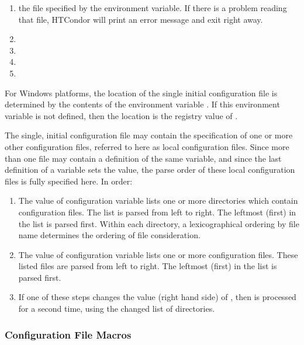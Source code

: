 \begin{enumerate}
   \item the file specified by the  environment variable.
   If there is a problem reading that file, HTCondor will print an error
   message and exit right away.
   \item {}
   \item {}
   \item {}
   \item {}
\end{enumerate}

For Windows platforms, 
the location of the single initial configuration file is determined by 
the contents of the environment variable .
If this environment variable is not defined, 
then the location is the registry value of 
. 

The single, initial configuration file may contain the specification 
of one or more other configuration files, referred to here as
local configuration files.
Since more than one file may contain a definition of the same variable,
and since the last definition of a variable sets the value, 
the parse order of these local configuration files
is fully specified here. 
In order: 
\begin{enumerate}
   \item The value of configuration variable  lists 
   one or more directories which contain configuration files. 
   The list is parsed from left to right. 
   The leftmost (first) in the list is parsed first. 
   Within each directory, 
   a lexicographical ordering by file name determines the ordering of 
   file consideration.
   \item The value of configuration variable  
   lists one or more configuration files. 
   These listed files are parsed from  left to right.
   The leftmost (first) in the list is parsed first.
   \item If one of these steps changes the value (right hand side) of 
   , 
   then  is processed for a second time,
    using the changed list of directories.
\end{enumerate}

\subsubsection{\label{sec:Config-File-Macros}Configuration File Macros} 

